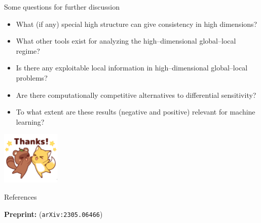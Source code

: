 \begin{frame}{Some questions for further discussion}

%
\begin{itemize}
\item What (if any) special high structure can give consistency in high dimensions?
\item What other tools exist for analyzing the high--dimensional global--local regime?
\item Is there any exploitable local information in high--dimensional global--local problems?
\item Are there computationally competitive alternatives to differential sensitivity?
\item To what extent are these results (negative and positive) relevant for machine learning?
\end{itemize}
%
\pause

\begin{center}
\includegraphics[height=1in]{thanks.png}
\end{center}

\end{frame}



\begin{frame}{References}

\textbf{Preprint: }\citet{giordano:2023:bayesij} (\texttt{arXiv:2305.06466})    

\footnotesize


\begingroup
\renewcommand{\section}[2]{}%

\endgroup

\end{frame}




